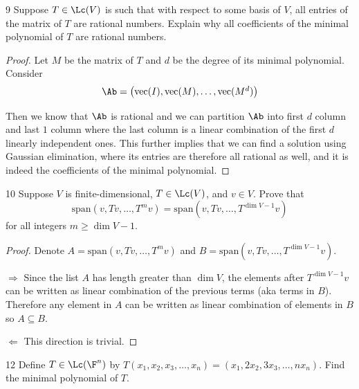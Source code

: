 \documentclass{extarticle}
\begin{document}
\begin{problem}{9}
    Suppose \(T \in \Lc(V)\) is such that with respect to some basis of \(V\), all entries of the matrix 
    of \(T\) are rational numbers. Explain why all coefficients of the minimal polynomial of 
    \(T\) are rational numbers. 
\end{problem}

\begin{proof}
Let \(M\) be the matrix of \(T\) and \(d\) be the degree of its minimal polynomial. Consider 
\[\Ab = \begin{pmatrix}
    \text{vec}(I), \text{vec}(M), \ldots, \text{vec}(M^d)
\end{pmatrix}\]

Then we know that \(\Ab\) is rational and we can partition \(\Ab\) into first \(d\) column and last \(1\) 
column where the last column is a linear combination of the first \(d\) linearly independent ones. This further 
implies that we can find a solution using Gaussian elimination, where its entries are therefore all rational 
as well, and it is indeed the coefficients of the minimal polynomial. 
\end{proof}

\begin{problem}{10}
    Suppose \(V\) is finite-dimensional, \(T \in \Lc(V)\), and \(v \in V\). Prove that 
    \[\text{span}(v, Tv, \ldots, T^m v) = \text{span}(v, Tv, \ldots, T^{\dim V - 1}v)\]
    for all integers \(m \geq \dim V - 1\).
\end{problem}

\begin{proof}
    Denote \(A = \text{span}(v, Tv, \ldots, T^m v)\) and \(B = \text{span}(v, Tv, \ldots, T^{\dim V - 1}v)\).

\(\Rightarrow\) Since the list \(A\) has length greater than \(\dim V\), the elements after \(T^{\dim V - 1}v\)
can be written as linear combination of the previous terms (aka terms in \(B\)). Therefore any element in \(A\) 
can be written as linear combination of elements in \(B\) so \(A \subseteq B\).

\(\Leftarrow\) This direction is trivial. 
\end{proof}

\begin{problem}{12}
    Define \(T \in \Lc(\F^n)\) by \(T(x_1, x_2, x_3, \ldots, x_n) = (x_1, 2x_2, 3x_3, \ldots, n x_n)\). 
    Find the minimal polynomial of \(T\).
\end{problem}
\end{document}
